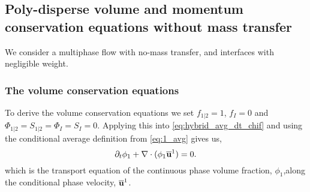 \subsection{Poly-disperse volume and momentum conservation equations without mass transfer}

We consider a multiphase flow with no-mass transfer, and interfaces with negligible weight. %


\subsubsection{The volume conservation equations}

To derive the volume conservation equations we set $f_{1|2} = 1$, $f_I = 0$ and  $\Phi_{1|2} = S_{1|2} =\Phi_{I} = S_{I} = 0$. 
Applying this into \ref{eq:hybrid_avg_dt_chif} and using the conditional average definition from \ref{eq:1_avg} gives us,
\begin{equation}
    \partial_t \phi_1
    + \mathbf{\nabla} \cdot (\phi_1 \overline{\textbf{u}}^1)
    = 0.
    \label{eq:hybrid_avg_dt_chi}
\end{equation}
which is the transport equation of the continuous phase volume fraction, $\phi_1$,along the conditional phase velocity, $\overline{\textbf{u}}^1$. 

